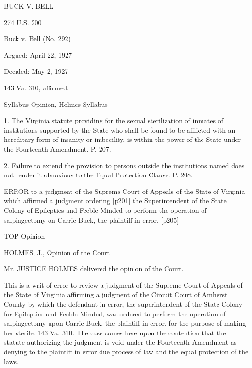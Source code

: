 \documentclass[12pt]{letter}
\begin{document}
BUCK V. BELL

274 U.S. 200

Buck v. Bell (No. 292)

Argued: April 22, 1927

Decided: May 2, 1927

143 Va. 310, affirmed.

Syllabus
Opinion, Holmes
Syllabus

1. The Virginia statute providing for the sexual sterilization of inmates of institutions supported by the State who shall be found to be afflicted with an hereditary form of insanity or imbecility, is within the power of the State under the Fourteenth Amendment. P. 207.

2. Failure to extend the provision to persons outside the institutions named does not render it obnoxious to the Equal Protection Clause. P. 208.

ERROR to a judgment of the Supreme Court of Appeals of the State of Virginia which affirmed a judgment ordering [p201] the Superintendent of the State Colony of Epileptics and Feeble Minded to perform the operation of salpingectomy on Carrie Buck, the plaintiff in error. [p205]

TOP
Opinion

HOLMES, J., Opinion of the Court

Mr. JUSTICE HOLMES delivered the opinion of the Court.

This is a writ of error to review a judgment of the Supreme Court of Appeals of the State of Virginia affirming a judgment of the Circuit Court of Amherst County by which the defendant in error, the superintendent of the State Colony for Epileptics and Feeble Minded, was ordered to perform the operation of salpingectomy upon Carrie Buck, the plaintiff in error, for the purpose of making her sterile. 143 Va. 310. The case comes here upon the contention that the statute authorizing the judgment is void under the Fourteenth Amendment as denying to the plaintiff in error due process of law and the equal protection of the laws.
\end{document}

